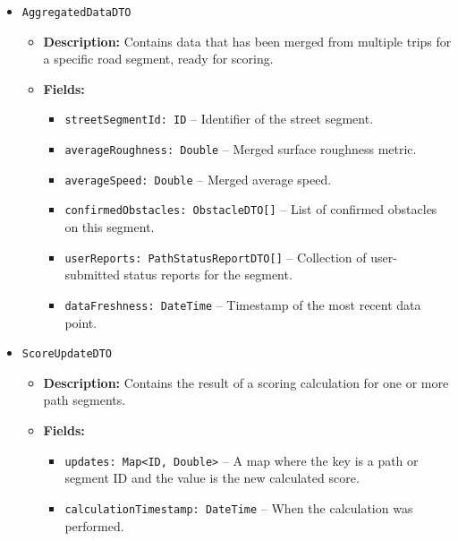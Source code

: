 \begin{itemize}
    \item \texttt{AggregatedDataDTO}
    \begin{itemize}
        \item \textbf{Description:} Contains data that has been merged from multiple trips for a specific road segment, ready for scoring.
        \item \textbf{Fields:}
        \begin{itemize}
            \item \texttt{streetSegmentId: ID} – Identifier of the street segment.
            \item \texttt{averageRoughness: Double} – Merged surface roughness metric.
            \item \texttt{averageSpeed: Double} – Merged average speed.
            \item \texttt{confirmedObstacles: ObstacleDTO[]} – List of confirmed obstacles on this segment.
            \item \texttt{userReports: PathStatusReportDTO[]} – Collection of user-submitted status reports for the segment.
            \item \texttt{dataFreshness: DateTime} – Timestamp of the most recent data point.
        \end{itemize}
    \end{itemize}

    \item \texttt{ScoreUpdateDTO}
    \begin{itemize}
        \item \textbf{Description:} Contains the result of a scoring calculation for one or more path segments.
        \item \textbf{Fields:}
        \begin{itemize}
            \item \texttt{updates: Map<ID, Double>} – A map where the key is a path or segment ID and the value is the new calculated score.
            \item \texttt{calculationTimestamp: DateTime} – When the calculation was performed.
        \end{itemize}
    \end{itemize}


\end{itemize}
